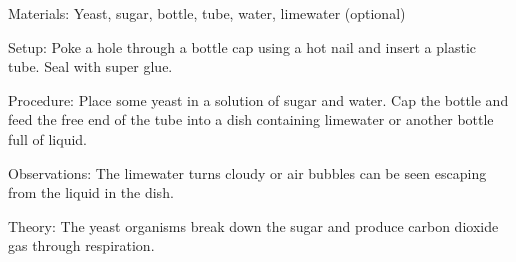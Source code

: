 \begin{multicols}{2}
\begin{description*}
\item[Materials:]{Yeast, sugar, bottle, tube, water, limewater (optional)}
\item[Setup:]{Poke a hole through a bottle cap using a hot nail and insert a plastic tube. Seal with super glue.}
\item[Procedure:]{Place some yeast in a solution of sugar and water. Cap the bottle and feed the free end of the tube into a dish containing limewater or another bottle full of liquid.}
\item[Observations:]{The limewater turns cloudy or air bubbles can be seen escaping from the liquid in the dish.}
\item[Theory:]{The yeast organisms break down the sugar and produce carbon dioxide gas through respiration.}
\end{description*}


\end{multicols}

\pagebreak